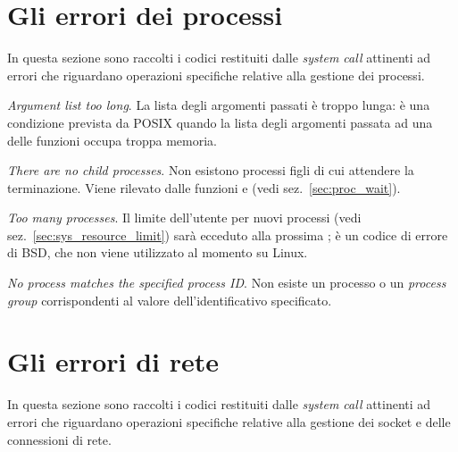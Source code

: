 \section{Gli errori dei processi}
\label{sec:err_proc_errors}

In questa sezione sono raccolti i codici restituiti dalle \textit{system call}
attinenti ad errori che riguardano operazioni specifiche relative alla
gestione dei processi.

\begin{basedescript}{\desclabelwidth{1.5cm}\desclabelstyle{\nextlinelabel}}
\item[\errcode{E2BIG} \textit{Argument list too long}.] La lista degli
  argomenti passati è troppo lunga: è una condizione prevista da POSIX quando
  la lista degli argomenti passata ad una delle funzioni  occupa
  troppa memoria.
\item[\errcode{ECHILD} \textit{There are no child processes}.] Non esistono
  processi figli di cui attendere la terminazione. Viene rilevato dalle
  funzioni  e  (vedi sez.~\ref{sec:proc_wait}).
\item[\errcode{EPROCLIM} \textit{Too many processes}.]  Il limite dell'utente
  per nuovi processi (vedi sez.~\ref{sec:sys_resource_limit}) sarà ecceduto
  alla prossima ; è un codice di errore di BSD, che non viene
  utilizzato al momento su Linux. 
\item[\errcode{ESRCH} \textit{No process matches the specified process ID}.]
  Non esiste un processo o un \textit{process group} corrispondenti al valore
  dell'identificativo specificato.
\end{basedescript}


\section{Gli errori di rete}
\label{sec:err_network}

In questa sezione sono raccolti i codici restituiti dalle \textit{system call}
attinenti ad errori che riguardano operazioni specifiche relative alla
gestione dei socket e delle connessioni di rete.

